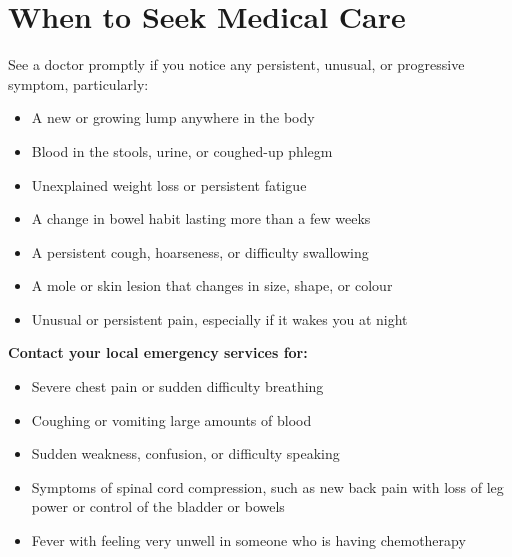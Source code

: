 \section*{When to Seek Medical Care}
See a doctor promptly if you notice any persistent, unusual, or progressive symptom, particularly:
\begin{itemize}
    \item A new or growing lump anywhere in the body
    \item Blood in the stools, urine, or coughed-up phlegm
    \item Unexplained weight loss or persistent fatigue
    \item A change in bowel habit lasting more than a few weeks
    \item A persistent cough, hoarseness, or difficulty swallowing
    \item A mole or skin lesion that changes in size, shape, or colour
    \item Unusual or persistent pain, especially if it wakes you at night
\end{itemize}
\textbf{Contact your local emergency services for:}
\begin{itemize}
    \item Severe chest pain or sudden difficulty breathing
    \item Coughing or vomiting large amounts of blood
    \item Sudden weakness, confusion, or difficulty speaking
    \item Symptoms of spinal cord compression, such as new back pain with loss of leg power or control of the bladder or bowels
    \item Fever with feeling very unwell in someone who is having chemotherapy
\end{itemize}

